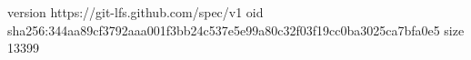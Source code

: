 version https://git-lfs.github.com/spec/v1
oid sha256:344aa89cf3792aaa001f3bb24c537e5e99a80c32f03f19cc0ba3025ca7bfa0e5
size 13399
